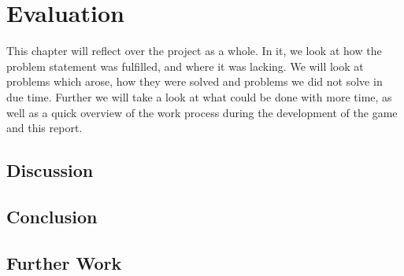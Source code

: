 \chapter{Evaluation}
This chapter will reflect over the project as a whole. In it, we look at how the problem statement was fulfilled, and where it was lacking. We will look at problems which arose, how they were solved and problems we did not solve in due time. Further we will take a look at what could be done with more time, as well as a quick overview of the work process during the development of the game and this report.

\section{Discussion}

\section{Conclusion}

\section{Further Work}


%
